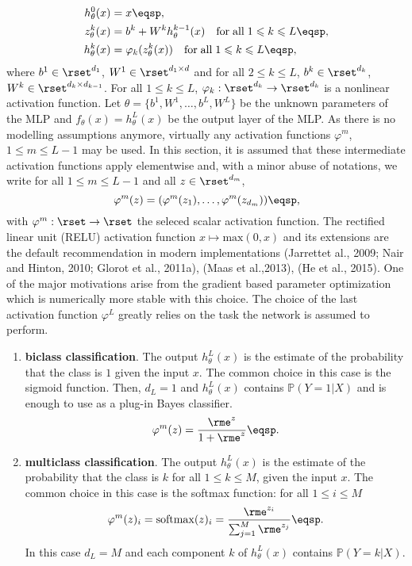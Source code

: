 \begin{align*}
h_{\theta}^0(x) &= x\eqsp,\\
z_{\theta}^k(x)  &= b^k + W^kh_{\theta}^{k-1}(x)\quad \mathrm{for\;all\;} 1\leqslant k\leqslant L\eqsp,\\
h_{\theta}^k(x)  &= \varphi_k(z_{\theta}^{k}(x))\quad \mathrm{for\;all\;}1\leqslant k\leqslant L\eqsp,
\end{align*}
where $b^1\in\rset^{d_1}$, $W^1\in\rset^{d_1\times d}$ and for all $2\leqslant k\leqslant L$, $b^k\in\rset^{d_k}$, $W^k\in\rset^{d_k\times d_{k-1}}$. For all $1\leqslant k\leqslant L$, $\varphi_k: \rset^{d_k} \to \rset^{d_k}$ is a nonlinear activation function. Let $\theta = \{b^1,W^1,\ldots,b^L,W^L\}$ be the unknown parameters of the MLP and $f_{\theta}(x) = h_{\theta}^L(x)$ be the output layer of the MLP. As there is no modelling assumptions anymore, virtually any activation functions $\varphi^m$, $1\leqslant m\leqslant L-1$ may be used. In this section, it is assumed that these intermediate activation functions apply elementwise and, with a minor abuse of notations, we write for all $1\leqslant m\leqslant L-1$ and all $z\in\rset^{d_m}$,
$$
\varphi^m(z) = (\varphi^m(z_1),\ldots, \varphi^m(z_{d_m}))\eqsp,
$$
with $\varphi^m: \rset\to \rset$ the seleced scalar activation function. The rectified linear unit (RELU) activation function $x \mapsto \mathrm{max}(0,x)$ and its extensions are the default recommendation in modern implementations  (Jarrettet al., 2009; Nair and Hinton, 2010; Glorot et al., 2011a), (Maas et al.,2013),  (He et al., 2015). One of the major motivations arise from the gradient based parameter optimization which is numerically more stable with this choice. The choice of the last activation function $\varphi^L$ greatly relies on the task the network is assumed to perform.
\begin{enumerate}[-]
\item {\bf biclass classification}. The output $h_{\theta}^L(x)$ is the estimate of the probability that the class is $1$ given the input $x$. The common choice in this case is the sigmoid function. Then, $d_L = 1$ and $h_{\theta}^L(x)$ contains $\mathbb{P}(Y=1 | X)$ and is enough to use as a plug-in Bayes classifier.
\[
\varphi^m(z) =  \frac{\rme^{z}}{1 + \rme^{z}}\eqsp.
\]
\item {\bf multiclass classification}. The output $h_{\theta}^L(x)$ is the estimate of the probability that the class is  $k$ for all $1\leqslant k\leqslant M$, given the input $x$. The common choice in this case is the softmax function: for all $1\leqslant i\leqslant M$
\[
\varphi^m(z)_i = \mathrm{softmax}(z)_i = \frac{\rme^{z_i}}{\sum_{j=1}^M\rme^{z_j}}\eqsp.
\]
In this case $d_L = M$ and each component $k$ of $h_{\theta}^L(x)$ contains $\mathbb{P}(Y=k | X)$.
\end{enumerate}

